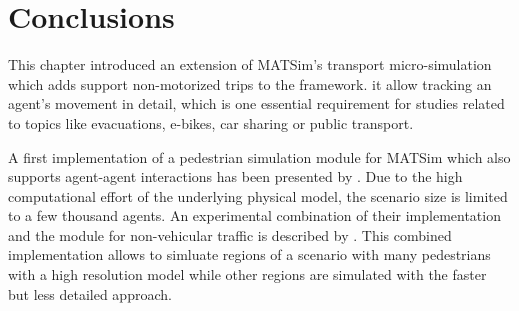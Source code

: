 {}

\section{Conclusions}
This chapter introduced an extension of MATSim's transport micro-simulation which adds support non-motorized trips to the framework. it allow tracking an agent's movement in detail, which is one essential requirement for studies related to topics like evacuations, e-bikes, car sharing or public transport.

A first implementation of a pedestrian simulation module for MATSim which also supports agent-agent interactions has been presented by \citet{LaemmelPlaue_PED_2012}. Due to the high computational effort of the underlying physical model, the scenario size is limited to a few thousand agents. An experimental combination of their implementation and the module for non-vehicular traffic is described by \citet{DoblerLaemmel_PED_2012}. This combined implementation allows to simluate regions of a scenario with many pedestrians with a high resolution model while other regions are simulated with the faster but less detailed approach.

